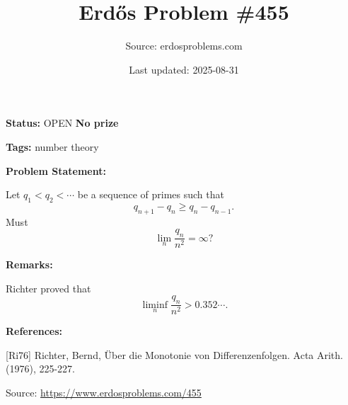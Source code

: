 \documentclass{article}
\title{Erd\H{o}s Problem \#455}
\date{Last updated: 2025-08-31}
\author{Source: erdosproblems.com}
\begin{document}
\maketitle

\noindent\textbf{Status:} OPEN \quad \textbf{No prize}

\noindent\textbf{Tags:} number theory

\medskip
\noindent\textbf{Problem Statement:}

Let $q_1<q_2<\cdots$ be a sequence of primes such that\[q_{n+1}-q_n\geq q_n-q_{n-1}.\]Must\[\lim_n \frac{q_n}{n^2}=\infty?\]

\bigskip
\noindent\textbf{Remarks:}

Richter \cite{Ri76} proved that\[\liminf_n \frac{q_n}{n^2}>0.352\cdots.\]

\bigskip
\noindent\textbf{References:}

[Ri76] Richter, Bernd, \"{U}ber die Monotonie von Differenzenfolgen. Acta Arith. (1976), 225-227.

\bigskip
\noindent\small{Source: \url{https://www.erdosproblems.com/455}}
\end{document}
